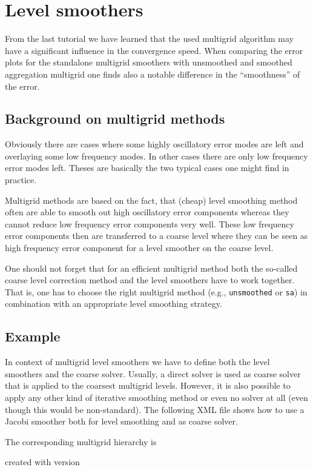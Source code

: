 \documentclass[10pt,fleqn]{book}
\newcommand\printScreenOutput[1]{

{\vspace{-0.3cm}\hfill\tiny{created with \muelu version }}
}
\begin{document}
\chapter{Level smoothers}

From the last tutorial we have learned that the used multigrid algorithm may have a significant influence in the convergence speed. When comparing the error plots for the standalone multigrid smoothers with unsmoothed and smoothed aggregation multigrid one finds also a notable difference in the ``smoothness'' of the error.

\section{Background on multigrid methods}
Obviously there are cases where some highly oscillatory error modes are left and overlaying some low frequency modes. In other cases there are only low frequency error modes left. Theses are basically the two typical cases one might find in practice.

Multigrid methods are based on the fact, that (cheap) level smoothing method often are able to smooth out high oscillatory error components whereas they cannot reduce low frequency error components very well. These low frequency error components then are transferred to a coarse level where they can be seen as high frequency error component for a level smoother on the coarse level.

One should not forget that for an efficient multigrid method both the so-called coarse level correction method and the level smoothers have to work together. That is, one has to choose the right multigrid method (e.g., \texttt{unsmoothed} or \texttt{sa}) in combination with an appropriate level smoothing strategy.

\section{Example}
In context of multigrid level smoothers we have to define both the level smoothers and the coarse solver. Usually, a direct solver is used as coarse solver that is applied to the coarsest multigrid levels. However, it is also possible to apply any other kind of iterative smoothing method or even no solver at all (even though this would be non-standard). The following XML file shows how to use a Jacobi smoother both for level smoothing and as coarse solver.

The corresponding multigrid hierarchy is
\printScreenOutput{s1_easy_jacobi.txt_3.fragment_3.fragment}
\end{document}
